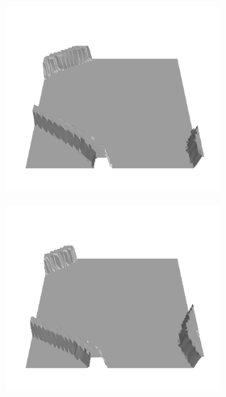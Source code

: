 \documentclass[../document.tex]{subfiles}
\begin{document}
\begin{figure}[H]
\begin{subfigure}[b]{1\textwidth}
\begin{subfigure}[b]{0.19\textwidth}
    \includegraphics[width=\linewidth]{../img/bars1-example-patches/3d/0.png}
    \end{subfigure}
    \begin{subfigure}[b]{0.19\textwidth}
    \includegraphics[width=\linewidth]{../img/bars1-example-patches/3d/2.png}    
    \end{subfigure}  
    \begin{subfigure}[b]{0.19\textwidth}

\end{subfigure}
\end{subfigure}
\end{figure}
\end{document}

